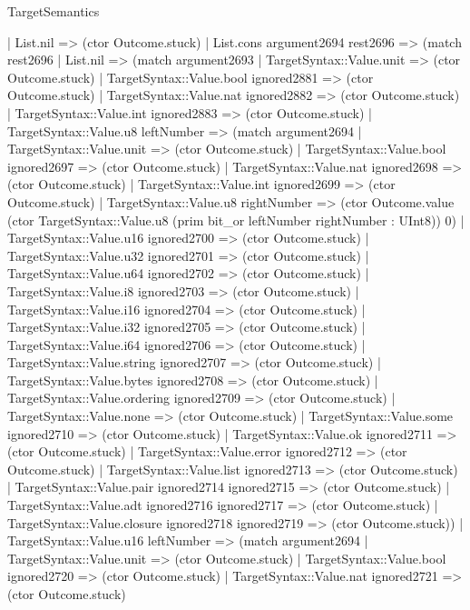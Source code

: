 \begin{lexlean}{TargetSemantics}
\begin{semanticmodule}
{        | List.nil => (ctor Outcome.stuck)
        | List.cons argument2694 rest2696 => (match rest2696
          | List.nil => (match argument2693
            | TargetSyntax::Value.unit => (ctor Outcome.stuck)
            | TargetSyntax::Value.bool ignored2881 => (ctor Outcome.stuck)
            | TargetSyntax::Value.nat ignored2882 => (ctor Outcome.stuck)
            | TargetSyntax::Value.int ignored2883 => (ctor Outcome.stuck)
            | TargetSyntax::Value.u8 leftNumber => (match argument2694
              | TargetSyntax::Value.unit => (ctor Outcome.stuck)
              | TargetSyntax::Value.bool ignored2697 => (ctor Outcome.stuck)
              | TargetSyntax::Value.nat ignored2698 => (ctor Outcome.stuck)
              | TargetSyntax::Value.int ignored2699 => (ctor Outcome.stuck)
              | TargetSyntax::Value.u8 rightNumber => (ctor Outcome.value (ctor TargetSyntax::Value.u8 (prim bit_or leftNumber rightNumber : UInt8)) 0)
              | TargetSyntax::Value.u16 ignored2700 => (ctor Outcome.stuck)
              | TargetSyntax::Value.u32 ignored2701 => (ctor Outcome.stuck)
              | TargetSyntax::Value.u64 ignored2702 => (ctor Outcome.stuck)
              | TargetSyntax::Value.i8 ignored2703 => (ctor Outcome.stuck)
              | TargetSyntax::Value.i16 ignored2704 => (ctor Outcome.stuck)
              | TargetSyntax::Value.i32 ignored2705 => (ctor Outcome.stuck)
              | TargetSyntax::Value.i64 ignored2706 => (ctor Outcome.stuck)
              | TargetSyntax::Value.string ignored2707 => (ctor Outcome.stuck)
              | TargetSyntax::Value.bytes ignored2708 => (ctor Outcome.stuck)
              | TargetSyntax::Value.ordering ignored2709 => (ctor Outcome.stuck)
              | TargetSyntax::Value.none => (ctor Outcome.stuck)
              | TargetSyntax::Value.some ignored2710 => (ctor Outcome.stuck)
              | TargetSyntax::Value.ok ignored2711 => (ctor Outcome.stuck)
              | TargetSyntax::Value.error ignored2712 => (ctor Outcome.stuck)
              | TargetSyntax::Value.list ignored2713 => (ctor Outcome.stuck)
              | TargetSyntax::Value.pair ignored2714 ignored2715 => (ctor Outcome.stuck)
              | TargetSyntax::Value.adt ignored2716 ignored2717 => (ctor Outcome.stuck)
              | TargetSyntax::Value.closure ignored2718 ignored2719 => (ctor Outcome.stuck))
            | TargetSyntax::Value.u16 leftNumber => (match argument2694
              | TargetSyntax::Value.unit => (ctor Outcome.stuck)
              | TargetSyntax::Value.bool ignored2720 => (ctor Outcome.stuck)
              | TargetSyntax::Value.nat ignored2721 => (ctor Outcome.stuck)
}
\end{semanticmodule}
\end{lexlean}
